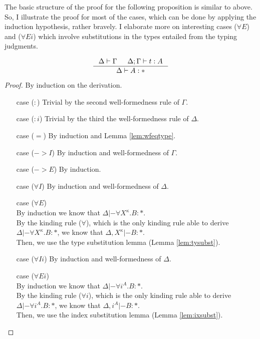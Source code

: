 The basic structure of the proof for the following proposition is similar to
above. So, I illustrate the proof for most of the cases, which can be done
by applying the induction hypothesis, rather bravely. I elaborate more on
interesting cases ($\forall E$) and ($\forall Ei$) which involve substitutions
in the types entailed from the typing judgments.
\begin{proposition}
\label{prop:wftype}
\[ \inference{ \Delta |- \Gamma & \Delta;\Gamma |- t : A}{ \Delta |- A : * }
\]
\end{proposition}
\begin{proof} By induction on the derivation.
\begin{itemize}
\item[case] ($:$)
	Trivial by the second well-formedness rule of $\Gamma$.
\item[case] ($:i$)
	Trivial by the third the well-formedness rule of $\Delta$.
\item[case] ($=$)
	By induction and Lemma \ref{lem:wfeqtype}.
\item[case] ($->$$I$)
	By induction and well-formedness of $\Gamma$.
\item[case] ($->$$E$)
	By induction.
\item[case] ($\forall I$)
	By induction and well-formedness of $\Delta$.
\item[case] ($\forall E$)\\
	By induction we know that $\Delta |- \forall X^\kappa.B : *$.\\
	By the kinding rule ($\forall$), which is the only kinding rule
	able to derive $\Delta |- \forall X^\kappa.B : *$, we know
	that $\Delta,X^\kappa |- B : *$.\\
	Then, we use the type substitution lemma (Lemma \ref{lem:tysubst}).
\item[case] ($\forall Ii$)
	By induction and well-formedness of $\Delta$.
\item[case] ($\forall Ei$)\\
	By induction we know that $\Delta |- \forall i^A.B : *$.\\
	By the kinding rule ($\forall i$), which is the only kinding rule
	able to derive $\Delta |- \forall i^A.B : *$, we know
	that $\Delta,i^A |- B : *$.\\
	Then, we use the index substitution lemma (Lemma \ref{lem:ixsubst}).
\end{itemize}
\end{proof}

